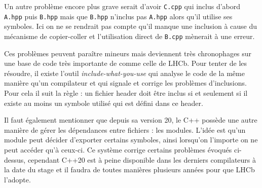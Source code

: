 \documentclass[a4paper,11pt]{report}
\begin{document}
Un autre problème encore plus grave serait d'avoir \verb'C.cpp' qui inclus d'abord \verb'A.hpp' puis \verb'B.hpp' mais que \verb'B.hpp' n'inclus pas \verb'A.hpp' alors qu'il utilise ses symboles.
Ici on ne se rendrait pas compte qu'il manque une inclusion à cause du mécanisme de copier-coller et l'utilisation direct de \verb'B.cpp' mènerait à une erreur.

\begin{center}
\end{center}

Ces problèmes peuvent paraître mineurs mais deviennent très chronophages sur une base de code très importante de comme celle de LHCb.
Pour tenter de les résoudre, il existe l'outil \emph{include-what-you-use} qui analyse le code de la même manière qu'un compilateur et qui signale et corrige les problèmes d'inclusions.
Pour cela il suit la règle : un fichier header doit être inclus si et seulement si il existe au moins un symbole utilisé qui est défini dans ce header.

Il faut également mentionner que depuis sa version 20, le C++ possède une autre manière de gérer les dépendances entre fichiers : les modules.
L'idée est qu'un module peut décider d'exporter certains symboles, ainsi lorsqu'on l'importe on ne peut accéder qu'à ceux-ci.
Ce système corrige certains problèmes évoqués ci-dessus,
cependant C++20 est à peine disponible dans les derniers compilateurs à la date du stage et il faudra de toutes manières plusieurs années pour que LHCb l'adopte.
\end{document}
